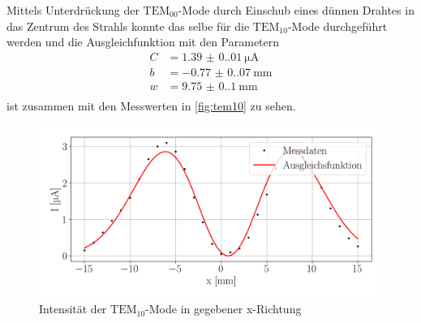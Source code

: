 Mittels Unterdrückung der $\mathrm{TEM_{00}}$-Mode durch Einschub eines dünnen Drahtes in das Zentrum des Strahls konnte das selbe für die $\mathrm{TEM_{10}}$-Mode durchgeführt werden und die Ausgleichfunktion mit den Parametern
\begin{align}
    C &= \SI{1.39(0.01)}{\micro\ampere}\\
    b &= \SI{-0.77(0.07)}{\milli\meter}\\
    w &= \SI{9.75(0.10)}{\milli\meter}\\
\end{align}
ist zusammen mit den Messwerten in \autoref{fig:tem10} zu sehen.
\begin{figure}[H]
    \centering
    \includegraphics[scale=0.55]{Skripte/TEM10Mode.png}
    \caption{Intensität der $\mathrm{TEM_{10}}$-Mode in gegebener x-Richtung}\label{fig:tem10}
\end{figure}

